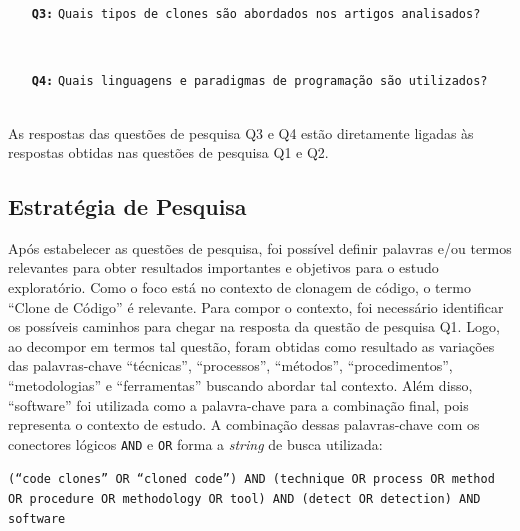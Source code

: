 \begin{itemize} \item[\texttt{\textbf{Q3:}}] \texttt{Quais tipos de clones são abordados nos artigos analisados?}
\end{itemize}
\\

\begin{itemize}
	\item[\texttt{\textbf{Q4:}}] \texttt{Quais linguagens e paradigmas de programação são utilizados? }
\end{itemize}
\\

As respostas das questões de pesquisa Q3 e Q4 estão diretamente ligadas às respostas obtidas nas questões de pesquisa Q1 e Q2. 

\subsection{Estratégia de Pesquisa}
Após estabelecer as questões de pesquisa, foi possível definir palavras e/ou termos relevantes para obter resultados importantes e objetivos para o estudo exploratório. Como o foco está no contexto de clonagem de código, o termo ``Clone de Código'' é relevante. Para compor o contexto, foi necessário identificar os possíveis caminhos para chegar na resposta da questão de pesquisa Q1. Logo, ao decompor em termos tal questão, foram obtidas como resultado as variações das palavras-chave ``técnicas'', ``processos'', ``métodos'', ``procedimentos'', ``metodologias'' e ``ferramentas'' buscando abordar tal contexto. Além disso, ``software'' foi utilizada como a palavra-chave para a combinação final, pois representa o contexto de estudo. A combinação dessas palavras-chave com os conectores lógicos \texttt{AND} e \texttt{OR} forma a \textit{string} de busca utilizada:
\newline

\begin{center}
	\noindent\texttt{(``code clones'' OR ``cloned code'') AND (technique OR process OR method OR procedure OR methodology OR tool) AND (detect OR detection) AND software}
	\newline
\end{center}

